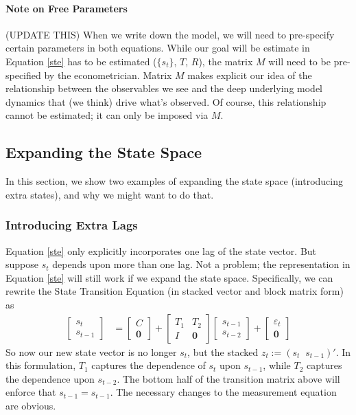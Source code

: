 \documentclass[a4paper,12pt]{article}
\begin{document}
\paragraph{Note on Free Parameters} (UPDATE THIS)
When we write down the model, we will need to pre-specify certain parameters in both equations.
While our goal will be estimate in Equation \ref{ste} has to be estimated ($\{s_t\}$, $T$, $R$), the matrix $M$ will need to be pre-specified by the econometrician. Matrix $M$ makes explicit our idea of the relationship between the observables we see and the deep underlying model dynamics that (we think) drive what's observed. Of course, this relationship cannot be estimated; it can only be imposed via $M$.

\newpage
\subsection{Expanding the State Space}

In this section, we show two examples of expanding the state space (introducing extra states), and why we might want to do that. 

\subsubsection{Introducing Extra Lags}

Equation \ref{ste} only explicitly incorporates one lag of the state vector. But suppose $s_t$ depends upon more than one lag. Not a problem; the representation in Equation \ref{ste} will still work if we expand the state space. Specifically, we can rewrite the State Transition Equation (in stacked vector and block matrix form) as 
\begin{align}
  \begin{bmatrix} s_{t} \\ s_{t-1}
  \end{bmatrix}
     &= 
  \begin{bmatrix} C \\ \mathbf{0} 
  \end{bmatrix}
  +\begin{bmatrix} T_1 & T_2 \\ I & \mathbf{0}
  \end{bmatrix}
  \begin{bmatrix} s_{t-1} \\ s_{t-2}
  \end{bmatrix}
  + \begin{bmatrix} 
      \varepsilon_{t}  \\ \mathbf{0}
    \end{bmatrix}
  \label{augmented.lags} 
\end{align}
So now our new state vector is no longer $s_t$, but the stacked $z_t:=(s_t \;\; s_{t-1})'$. In this formulation, $T_1$ captures the dependence of $s_t$ upon $s_{t-1}$, while $T_2$ captures the dependence upon $s_{t-2}$. The bottom half of the transition matrix above will enforce that $s_{t-1}=s_{t-1}$. The necessary changes to the measurement equation are obvious.
\end{document}
